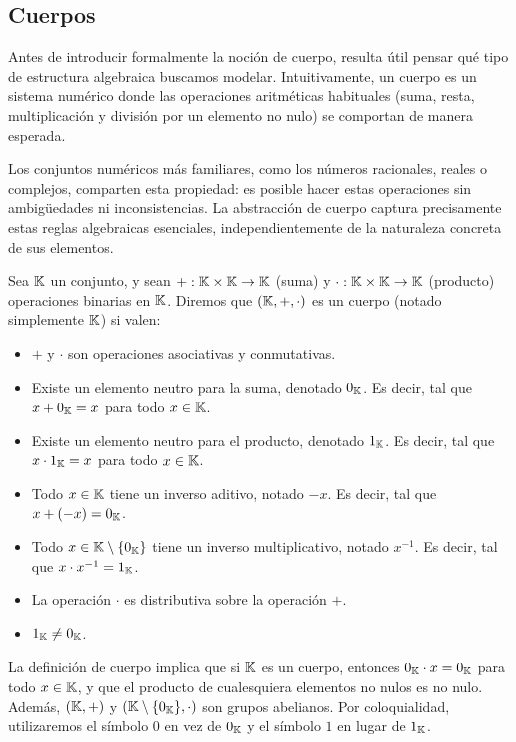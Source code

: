 
\subsection{Cuerpos}
\label{subsec:apendice-a-cuerpos-finitos-cuerpos}
Antes de introducir formalmente la noción de cuerpo, resulta útil pensar qué tipo de estructura algebraica buscamos modelar. Intuitivamente, un cuerpo es un sistema numérico donde las operaciones aritméticas habituales (suma, resta, multiplicación y división por un elemento no nulo) se comportan de manera esperada.

Los conjuntos numéricos más familiares, como los números racionales, reales o complejos, comparten esta propiedad: es posible hacer estas operaciones sin ambigüedades ni inconsistencias. La abstracción de cuerpo captura precisamente estas reglas algebraicas esenciales, independientemente de la naturaleza concreta de sus elementos.

\begin{definition}[Cuerpo]
\label{def:apendice-a-cuerpos-finitos-cuerpo}
	Sea $\mathbb{K}$ un conjunto, y sean $+: \mathbb{K} \times \mathbb{K} \to \mathbb{K}$ (suma) y $\cdot: \mathbb{K} \times \mathbb{K} \to \mathbb{K}$ (producto) operaciones binarias en $\mathbb{K}$. Diremos que $(\mathbb{K}, +, \cdot)$ es un cuerpo (notado simplemente $\mathbb{K}$) si valen:
	\begin{itemize}[noitemsep]
		\item $+$ y $\cdot$ son operaciones asociativas y conmutativas.
		\item Existe un elemento neutro para la suma, denotado $0_{\mathbb{K}}$. Es decir, tal que $x + 0_{\mathbb{K}} = x$ para todo $x \in \mathbb{K}$.
		\item Existe un elemento neutro para el producto, denotado $1_{\mathbb{K}}$. Es decir, tal que $x \cdot 1_{\mathbb{K}} = x$ para todo $x \in \mathbb{K}$.
		\item Todo $x \in \mathbb{K}$ tiene un inverso aditivo, notado $-x$. Es decir, tal que $x + (-x) = 0_{\mathbb{K}}$.
		\item Todo $x \in \mathbb{K} \setminus \{0_{\mathbb{K}}\}$ tiene un inverso multiplicativo, notado $x^{-1}$. Es decir, tal que $x \cdot x^{-1} = 1_{\mathbb{K}}$.
		\item La operación $\cdot$ es distributiva sobre la operación $+$.
		\item $1_{\mathbb{K}} \neq 0_{\mathbb{K}}$.
	\end{itemize}
\end{definition}

La definición de cuerpo implica que si $\mathbb{K}$ es un cuerpo, entonces $0_{\mathbb{K}} \cdot x = 0_{\mathbb{K}}$ para todo $x \in \mathbb{K}$, y que el producto de cualesquiera elementos no nulos es no nulo. Además, $(\mathbb{K}, +)$ y $(\mathbb{K} \setminus \{0_{\mathbb{K}}\}, \cdot)$ son grupos abelianos. Por coloquialidad, utilizaremos el símbolo $0$ en vez de $0_{\mathbb{K}}$ y el símbolo $1$ en lugar de $1_{\mathbb{K}}$.

